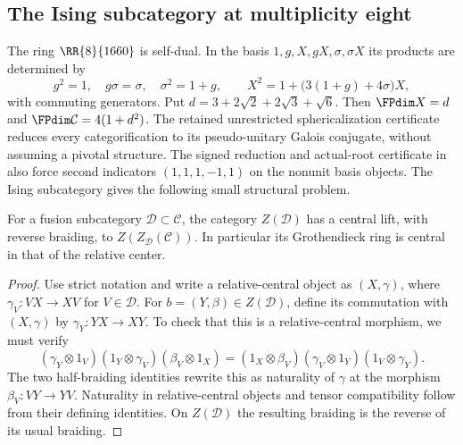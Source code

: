 \subsection{The Ising subcategory at multiplicity eight}
\label{subsec:frontier-1660}
The ring $\RR{8}{1660}$ is self-dual. In the basis
$1,g,X,gX,\sigma,\sigma X$ its products are determined by
\[
 g^2=1,\quad g\sigma=\sigma,\quad\sigma^2=1+g,\qquad
 X^2=1+\bigl(3(1+g)+4\sigma\bigr)X,
\]
with commuting generators. Put $d=3+2\sqrt2+2\sqrt3+\sqrt6$.
Then $\FPdim X=d$ and $\FPdim\mathcal C=4(1+d^2)$.
The retained unrestricted sphericalization certificate reduces every
categorification to its pseudo-unitary Galois conjugate, without
assuming a pivotal structure. The signed reduction and actual-root
certificate in  also force
second indicators $(1,1,1,-1,1)$ on the nonunit basis objects.
The Ising subcategory gives the following small structural problem.

\begin{lemma}
For a fusion subcategory $\mathcal D\subset\mathcal C$, the category
$Z(\mathcal D)$ has a central lift, with reverse braiding, to
$Z(Z_{\mathcal D}(\mathcal C))$. In particular its Grothendieck ring
is central in that of the relative center.
\end{lemma}
\begin{proof}
Use strict notation and write a relative-central object as $(X,\gamma)$,
where $\gamma_V:VX\to XV$ for $V\in\mathcal D$. For
$b=(Y,\beta)\in Z(\mathcal D)$, define its commutation with $(X,\gamma)$
by $\gamma_Y:YX\to XY$. To check that this is a relative-central morphism,
we must verify
\[
 (\gamma_Y\otimes1_V)(1_Y\otimes\gamma_V)(\beta_V\otimes1_X)
 =(1_X\otimes\beta_V)(\gamma_V\otimes1_Y)(1_V\otimes\gamma_Y).
\]
The two half-braiding identities rewrite this as naturality of $\gamma$
at the morphism $\beta_V:VY\to YV$. Naturality in relative-central objects
and tensor compatibility follow from their defining identities. On
$Z(\mathcal D)$ the resulting braiding is the reverse of its usual braiding.
\end{proof}

